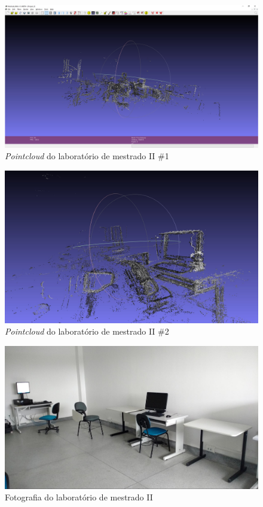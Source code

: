 \begin{figure}[!htb]
	\centering
		\includegraphics[width= \textwidth]{Imagens/figura4-13.jpg}
	\caption{\textit{Pointcloud} do laboratório de mestrado II \#1}
	\label{fig4:13}
\end{figure}

\begin{figure}[!htb]
	\centering
		\includegraphics[width= \textwidth]{Imagens/figura4-14.jpg}
	\caption{\textit{Pointcloud} do laboratório de mestrado II \#2}
	\label{fig4:14}
\end{figure}

\begin{figure}[!htb]
	\centering
		\includegraphics[width= \textwidth]{Imagens/figura4-15.jpg}
	\caption{Fotografia do laboratório de mestrado II}
	\label{fig4:15}
\end{figure}


